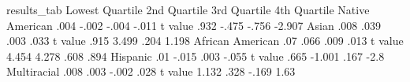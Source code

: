 	results_tab			
	Lowest Quartile	2nd Quartile	3rd Quartile	4th Quartile
Native American	.004	-.002	-.004	-.011
t value	.932	-.475	-.756	-2.907
Asian	.008	.039	.003	.033
t value	.915	3.499	.204	1.198
African American	.07	.066	.009	.013
t value	4.454	4.278	.608	.894
Hispanic	.01	-.015	.003	-.055
t value	.665	-1.001	.167	-2.8
Multiracial	.008	.003	-.002	.028
t value	1.132	.328	-.169	1.63
